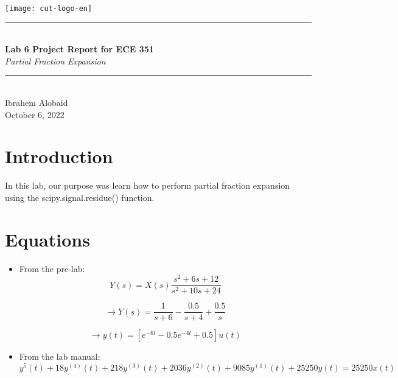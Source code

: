 \documentclass[12pt,a4paper]{article}
\newcommand{\HRule}{\rule{\linewidth}{0.5mm}}
\begin{document}
\begin{titlepage}
\begin{center}
\texttt{[image: cut-logo-en]}~\\[2cm]
\HRule \\[0.4cm]
{ \LARGE 
  \textbf{Lab 6 Project Report for ECE 351}\\[0.4cm]
  \emph{Partial Fraction Expansion}\\[0.4cm]
}
\HRule \\[1.5cm]
{ \large
  Ibrahem Alobaid \\[0.1cm]
  October 6, 2022\\[0.1cm]
}
\vfill

\end{center}
\end{titlepage}
\newpage
\tableofcontents
{}
\newpage
\setcounter{page}{1}
\section{Introduction}\label{sec:intro}
    In this lab, our purpose was learn how to perform partial fraction expansion using the scipy.signal.residue() function.

\section{Equations}\label{sec:lit-rev}

\begin{itemize}
    \item 
    From the pre-lab:
\begin{equation}
    Y(s) = X(s)\frac{s^2+6s+12}{s^2+10s+24} 
\end{equation}

\newline
    $$\rightarrow Y(s) = \frac{1}{s+6}-\frac{0.5}{s+4}+\frac{0.5}{s}$$

\newline
    $$\rightarrow y(t) = [e^{-6t}-0.5e^{-4t}+0.5]u(t)$$

    \item
    From the lab manual:
\begin{equation}
    y^{5}(t)+18y^{(4)}(t)+218y^{(3)}(t)+2036y^{(2)}(t)+9085y^{(1)}(t)+25250y(t) = 25250x(t)
\end{equation}
\end{itemize}
\end{document}
